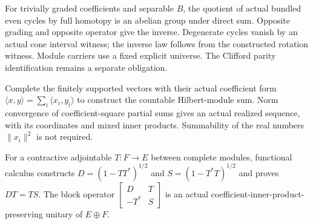 \begin{proposition}\label{prop:even-full-homotopy-group}
\leanok
For trivially graded coefficients and separable $B$, the quotient of actual
bundled even cycles by full homotopy is an abelian group under direct sum.
Opposite grading and opposite operator give the inverse. Degenerate cycles
vanish by an actual cone interval witness; the inverse law follows from the
constructed rotation witness. Module carriers use a fixed explicit universe.
The Clifford parity identification remains a separate obligation.
\end{proposition}

\begin{proposition}\label{prop:countable-hilbert-module-sum}
\leanok
Complete the finitely supported vectors with their actual coefficient form
$\langle x,y\rangle=\sum_i\langle x_i,y_i\rangle$ to construct the countable
Hilbert-module sum. Norm convergence of coefficient-square partial sums gives
an actual realized sequence, with its coordinates and mixed inner products.
Summability of the real numbers $\|x_i\|^2$ is not required.
\end{proposition}

\begin{proposition}\label{prop:module-julia-unitary}
\leanok
For a contractive adjointable $T:F\to E$ between complete modules, functional
calculus constructs $D=(1-TT^*)^{1/2}$ and $S=(1-T^*T)^{1/2}$ and proves
$DT=TS$. The block operator
$\left[\begin{smallmatrix}D&T\\-T^*&S\end{smallmatrix}\right]$
is an actual coefficient-inner-product-preserving unitary of $E\oplus F$.
\end{proposition}

